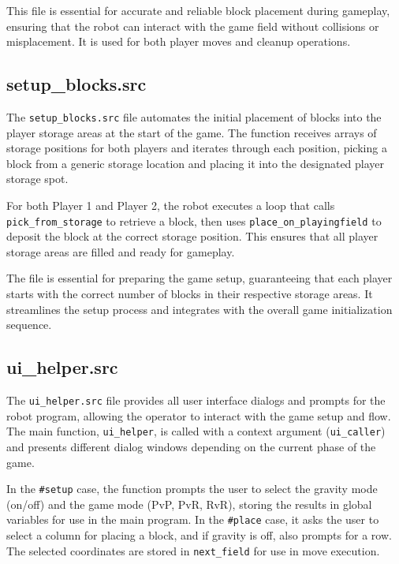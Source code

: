 \documentclass{article}
\begin{document}
            This file is essential for accurate and reliable block placement during gameplay, ensuring that the robot can interact with the game field without collisions or misplacement. It is used for both player moves and cleanup operations.

        \subsection{setup\_blocks.src}
            The \texttt{setup\_blocks.src} file automates the initial placement of blocks into the player storage areas at the start of the game. The function receives arrays of storage positions for both players and iterates through each position, picking a block from a generic storage location and placing it into the designated player storage spot.

            For both Player 1 and Player 2, the robot executes a loop that calls \texttt{pick\_from\_storage} to retrieve a block, then uses \texttt{place\_on\_playingfield} to deposit the block at the correct storage position. This ensures that all player storage areas are filled and ready for gameplay.

            The file is essential for preparing the game setup, guaranteeing that each player starts with the correct number of blocks in their respective storage areas. It streamlines the setup process and integrates with the overall game initialization sequence.

        \subsection{ui\_helper.src}
            The \texttt{ui\_helper.src} file provides all user interface dialogs and prompts for the robot program, allowing the operator to interact with the game setup and flow. The main function, \texttt{ui\_helper}, is called with a context argument (\texttt{ui\_caller}) and presents different dialog windows depending on the current phase of the game.

            In the \texttt{\#setup} case, the function prompts the user to select the gravity mode (on/off) and the game mode (PvP, PvR, RvR), storing the results in global variables for use in the main program. In the \texttt{\#place} case, it asks the user to select a column for placing a block, and if gravity is off, also prompts for a row. The selected coordinates are stored in \texttt{next\_field} for use in move execution.
\end{document}
